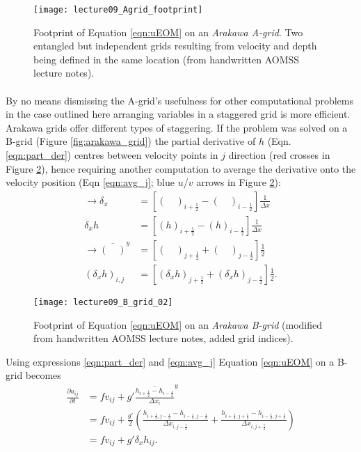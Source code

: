 \begin{figure}
\begin{center}
\texttt{[image: lecture09\_Agrid\_footprint]}
\label{fig:decoupled_grid}
\caption{Footprint of Equation \ref{eqn:uEOM} on an \textit{Arakawa A-grid}. Two entangled but independent grids resulting from velocity and depth being defined in the same location (from handwritten AOMSS lecture notes).}
\end{center}
\end{figure}
%
\paragraph*{}
By no means dismissing the A-grid's usefulness for other computational problems in the case outlined here arranging variables in a staggered grid is more efficient.
Arakawa grids offer different types of staggering.  If the problem was solved on a B-grid (Figure \ref{fig:arakawa_grid}) the partial derivative of $h$ (Eqn. \ref{eqn:part_der}) centres between velocity points in $j$ direction (red crosses in Figure \ref{fig:B_Cgrid}), hence requiring another computation to average the derivative onto the velocity position (Eqn \ref{eqn:avg_j};  blue $u$/$v$ arrows in Figure \ref{fig:B_Cgrid}):  
%
\begin{align}
\rightarrow \delta_x &= \left[(\quad )_{i+\frac{1}{2}} - (\quad )_{i-\frac{1}{2}}  \right] \frac{1}{\Delta x}  \nonumber \\
\delta_x h &= \left[(h)_{i+\frac{1}{2}} - (h)_{i-\frac{1}{2}}  \right] \frac{1}{\Delta x} \label{eqn:part_der}\\
\rightarrow \overline{(\quad)}^y &= \left[ (\quad )_{j+\frac{1}{2}} + (\quad )_{j-\frac{1}{2}}  \right] \frac{1}{2}  \nonumber \\
(\delta_x h)_{i,j} &= \left[ (\delta_x h)_{j+\frac{1}{2}} + (\delta_x h)_{j-\frac{1}{2}}  \right] \frac{1}{2}. \label{eqn:avg_j}
\end{align} 
%
%
\begin{figure}
\begin{center}
\texttt{[image: lecture09\_B\_grid\_02]}
\label{fig:B_Cgrid}
\caption{Footprint of Equation \ref{eqn:uEOM} on an \textit{Arakawa B-grid} (modified from handwritten AOMSS lecture notes, added grid indices).}
\end{center}
\end{figure}
%
Using expressions \ref{eqn:part_der} and \ref{eqn:avg_j} Equation \ref{eqn:uEOM} on a B-grid becomes
\begin{align}
\frac{\partial u_{ij}}{\partial t} &= fv_{ij} + g'\overline{\frac{h_{i+\frac{1}{2}} - h_{i-\frac{1}{2}}}{\Delta x_i}}^y \\
&= fv_{ij} + \frac{g'}{2}\left( 
\frac{h_{i+\frac{1}{2},j-\frac{1}{2}} - h_{i-\frac{1}{2},j-\frac{1}{2}}}{\Delta x_{i,j-\frac{1}{2}}} + 
\frac{h_{i+\frac{1}{2},j+\frac{1}{2}} - h_{i-\frac{1}{2},j+\frac{1}{2}}}{\Delta x_{i,j+\frac{1}{2}}} \right) \\
&= fv_{ij} + g' \delta_xh_{ij}.
\end{align}
